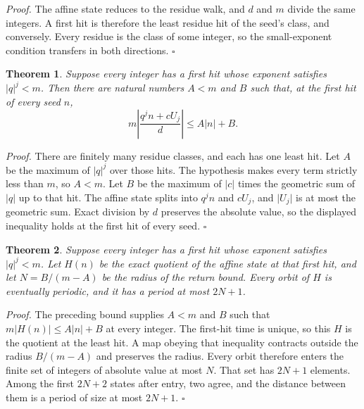 \documentclass[11pt,letterpaper]{article}
\newtheorem{theorem}{Theorem}
\newenvironment{proof}{\noindent\textit{Proof.}}{\hfill\(\square\)}
\begin{document}
\begin{proof}
The affine state reduces to the residue walk, and \(d\) and \(m\) divide the same integers. A first hit is therefore the least residue hit of the seed's class, and conversely. Every residue is the class of some integer, so the small-exponent condition transfers in both directions.
\end{proof}

\begin{theorem}
\label{thm:uniformreturn}
Suppose every integer has a first hit whose exponent satisfies \(\lvert q\rvert^j<m\). Then there are natural numbers \(A<m\) and \(B\) such that, at the first hit of every seed \(n\),
\[
m\left\lvert\frac{q^{j}n+cU_{j}}{d}\right\rvert
\le A\lvert n\rvert+B.
\]
\end{theorem}

\begin{proof}
There are finitely many residue classes, and each has one least hit. Let \(A\) be the maximum of \(\lvert q\rvert^j\) over those hits. The hypothesis makes every term strictly less than \(m\), so \(A<m\). Let \(B\) be the maximum of \(\lvert c\rvert\) times the geometric sum of \(\lvert q\rvert\) up to that hit. The affine state splits into \(q^{j}n\) and \(cU_{j}\), and \(\lvert U_{j}\rvert\) is at most the geometric sum. Exact division by \(d\) preserves the absolute value, so the displayed inequality holds at the first hit of every seed.
\end{proof}

\begin{theorem}
\label{thm:returnperiodic}
Suppose every integer has a first hit whose exponent satisfies \(\lvert q\rvert^j<m\). Let \(H(n)\) be the exact quotient of the affine state at that first hit, and let \(N=B/(m-A)\) be the radius of the return bound. Every orbit of \(H\) is eventually periodic, and it has a period at most \(2N+1\).
\end{theorem}

\begin{proof}
The preceding bound supplies \(A<m\) and \(B\) such that \(m\lvert H(n)\rvert\le A\lvert n\rvert+B\) at every integer. The first-hit time is unique, so this \(H\) is the quotient at the least hit. A map obeying that inequality contracts outside the radius \(B/(m-A)\) and preserves the radius. Every orbit therefore enters the finite set of integers of absolute value at most \(N\). That set has \(2N+1\) elements. Among the first \(2N+2\) states after entry, two agree, and the distance between them is a period of size at most \(2N+1\).
\end{proof}
\end{document}
